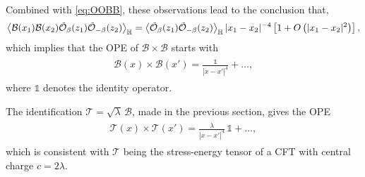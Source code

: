 \documentclass[a4paper,11pt]{article}
\begin{document}
Combined with \eqref{eq:OOBB}, these observations lead to the conclusion that,
\begin{align}
\begin{split}
\Braket{ \mathcal{B}(x_1) \mathcal{B}(x_2) \tilde{\mathcal{O}}_{\beta}(z_1) \tilde{\mathcal{O}}_{-\beta}(z_2) }_{\mathbb{H}} = \Braket{\tilde{\mathcal{O}}_{\beta}(z_1) \tilde{\mathcal{O}}_{-\beta}(z_2)}_{\mathbb{H}} |x_1-x_2|^{-4} \left[ 1 + O\left( |x_1-x_2|^{2} \right) \right],
\end{split}
\end{align}
which implies that the OPE of $\mathcal{B} \times \mathcal{B}$ starts with
\begin{align} \label{eq:BxB-first-term}
\begin{split}
\mathcal{B}(x) \times \mathcal{B}(x') = \frac{\mathbb{1}}{|x-x'|^{4}}  + \ldots,
\end{split}
\end{align}
where $\mathbb{1}$ denotes the identity operator.

The identification $\mathcal{T} = \sqrt{\lambda} \, \mathcal{B}$, made in the previous section, gives the OPE
\begin{align} \label{eq:TxT-first-term}
\begin{split}
\mathcal{T}(x) \times \mathcal{T}(x') = \frac{\lambda}{|x-x'|^{4}} \, \mathbb{1} + \ldots,
\end{split}
\end{align}
which is consistent with $\mathcal{T}$ being the stress-energy tensor of a CFT with central charge $c=2\lambda$.
\end{document}
